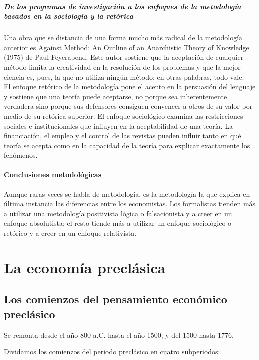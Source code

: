 \documentclass[10pt]{book}
\begin{document}
\subsubsection{De los programas de investigación a los enfoques de la metodología basados en la sociología y la retórica}
Una obra que se distancia de una forma mucho más radical de la metodología anterior es Against Method: An Outline of an Anarchistic Theory of Knowledge (1975) de Paul Feyerabend. Este autor sostiene que la aceptación de cualquier método limita la creatividad en la resolución de los problemas y que la mejor ciencia es, pues, la que no utiliza ningún método; en otras palabras, todo vale.\\

El enfoque retórico de la metodología pone el acento en la persuasión del lenguaje y sostiene que una teoría puede aceptarse, no porque sea inherentemente verdadera sino porque sus defensores consiguen convencer a otros de su valor por medio de su retórica superior. El enfoque sociológico examina las restricciones sociales e institucionales que influyen en la aceptabilidad de una teoría. La financiación, el empleo y el control de las revistas pueden influir tanto en qué teoría se acepta como en la capacidad de la teoría para explicar exactamente los fenómenos.

\subsection{Conclusiones metodológicas}
Aunque raras veces se habla de metodología, es la metodología la que explica en última instancia las diferencias entre los economistas. Los formalistas tienden más a utilizar una metodología positivista lógica o falsacionista y a creer en un enfoque absolutista; el resto tiende más a utilizar un enfoque sociológico o retórico y a creer en un enfoque relativista.


\part{La economía preclásica}

\chapter{Los comienzos del pensamiento económico preclásico}

Se remonta desde el año 800 a.C. hasta el año 1500, y del 1500 hasta 1776.

Dividamos los comienzos del periodo preclásico en cuatro subperiodos:
\end{document}
